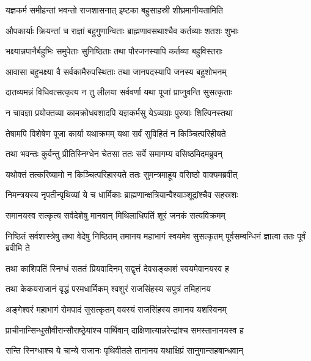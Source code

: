 \twolineshloka
{यज्ञकर्म समीहन्तां भवन्तो राजशासनात्}
{इष्टका बहुसाहस्री शीघ्रमानीयतामिति} %

\twolineshloka
{औपकार्याः क्रियन्तां च राज्ञां बहुगुणान्विताः}
{ब्राह्मणावसथाश्चैव कर्तव्याः शतशः शुभाः} %

\twolineshloka
{भक्ष्यान्नपानैर्बहुभिः समुपेताः सुनिष्ठिताः}
{तथा पौरजनस्यापि कर्तव्या बहुविस्तराः} %

\twolineshloka
{आवासा बहुभक्ष्या वै सर्वकामैरुपस्थिताः}
{तथा जानपदस्यापि जनस्य बहुशोभनम्} %

\twolineshloka
{दातव्यमन्नं विधिवत्सत्कृत्य न तु लीलया}
{सर्ववर्णा यथा पूजां प्राप्नुवन्ति सुसत्कृताः} %

\twolineshloka
{न चावज्ञा प्रयोक्तव्या कामक्रोधवशादपि}
{यज्ञकर्मसु येऽव्यग्राः पुरुषाः शिल्पिनस्तथा} %

\twolineshloka
{तेषामपि विशेषेण पूजा कार्या यथाक्रमम्}
{यथा सर्वं सुविहितं न किञ्चित्परिहीयते} %

\twolineshloka
{तथा भवन्तः कुर्वन्तु प्रीतिस्निग्धेन चेतसा}
{ततः सर्वे समागम्य वसिष्ठमिदमब्रुवन्} %

\twolineshloka
{यथोक्तं तत्करिष्यामो न किञ्चित्परिहास्यते}
{ततः सुमन्त्रमाहूय वसिष्ठो वाक्यमब्रवीत्} %

\twolineshloka
{निमन्त्रयस्य नृपतीन्पृथिव्यां ये च धार्मिकाः}
{ब्राह्मणान्क्षत्रियान्वैश्याञ्शूद्रांश्चैव सहस्रशः} %

\twolineshloka
{समानयस्व सत्कृत्य सर्वदेशेषु मानवान्}
{मिथिलाधिपतिं शूरं जनकं सत्यविक्रमम्} %

\threelineshloka
{निष्ठितं सर्वशास्त्रेषु तथा वेदेषु निष्ठितम्}
{तमानय महाभागं स्वयमेव सुसत्कृतम्}
{पूर्वसम्बन्धिनं ज्ञात्वा ततः पूर्वं ब्रवीमि ते} %

\twolineshloka
{तथा काशिपतिं स्निग्धं सततं प्रियवादिनम्}
{सद्वृत्तं देवसङ्काशं स्वयमेवानयस्व ह} %

\twolineshloka
{तथा केकयराजानं वृद्धं परमधार्मिकम्}
{श्वशुरं राजसिंहस्य सपुत्रं तमिहानय} %

\twolineshloka
{अङ्गेश्वरं महाभागं रोमपादं सुसत्कृतम्}
{वयस्यं राजसिंहस्य तमानय यशस्विनम्} %

\twolineshloka
{प्राचीनान्सिन्धुसौवीरान्सौराष्ठ्रेयांश्च पार्थिवान्}
{दाक्षिणात्यान्नरेन्द्रांश्च समस्तानानयस्व ह} %

\twolineshloka
{सन्ति स्निग्धाश्च ये चान्ये राजानः पृथिवीतले}
{तानानय यथाक्षिप्रं सानुगान्सहबान्धवान्} %

